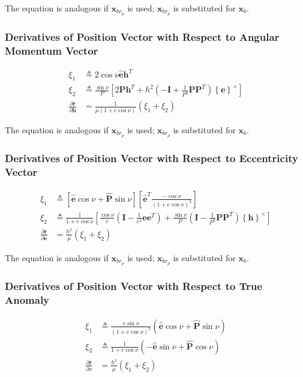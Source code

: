 \documentclass[]{article}
\newcommand{\vb}[1]{\bm{#1}} %
\newcommand{\vbh}[1]{\hat{\bm{#1}}} %
\newcommand{\pd}[2]{\frac{\partial #1}{\partial #2}} %
\newcommand{\crossmat}[1]{\left\{ {#1} \right\}^{\times}} %
\newcommand{\xb}[0]{\vb{x}_b}
\newcommand{\xbrp}[0]{\vb{x}_{br_p}}
\begin{document}
The equation is analogous if $\xbrp$ is used; $\xbrp$ is substituted for $\xb$.

\subsubsection{Derivatives of Position Vector with Respect to Angular Momentum Vector}

\begin{align}
	\xi_1 &\triangleq 2 \cos{\nu} \vbh{e} \vb{h}^T \\
	\xi_2 &\triangleq \frac{\sin{\nu}}{P} \left[ 2 \vb{P} \vb{h}^T + h^2 \left( -\vb{I} + \frac{1}{P^2} \vb{P} \vb{P}^T \right) \left\{ \vb{e} \right\}^{\times} \right] \\
	\pd{\vb{r}}{\vb{h}} &= \frac{1}{\mu \left(1 + e \cos \nu \right)} \left( \xi_1 + \xi_2 \right)
\end{align}

The equation is analogous if $\xbrp$ is used; $\xbrp$ is substituted for $\xb$.

\subsubsection{Derivatives of Position Vector with Respect to Eccentricity Vector}

\begin{align}
	\xi_1 &\triangleq  \left[ \vbh{e} \cos{\nu} + \vbh{P} \sin{\nu} \right] \left[\vbh{e}^T \frac{-\cos{\nu}}{\left( 1 + e \cos{\nu} \right)^2} \right] \\
	\xi_2 &\triangleq \frac{1}{1 + e \cos{\nu}} \left[ \frac{\cos{\nu}}{e} \left( \vb{I} - \frac{1}{e^2} \vb{e} \vb{e}^T \right) + \frac{\sin{\nu}}{P} \left( \vb{I} - \frac{1}{P^2} \vb{P} \vb{P}^T \right) \crossmat{\vb{h}} \right] \\
	\pd{\vb{r}}{\vb{e}} &= \frac{h^2}{\mu} \left( \xi_1 + \xi_2 \right)
\end{align}

The equation is analogous if $\xbrp$ is used; $\xbrp$ is substituted for $\xb$.

\subsubsection{Derivatives of Position Vector with Respect to True Anomaly}

\begin{align}
	\xi_1 &\triangleq \frac{e \sin{\nu}}{\left(1 + e \cos{\nu} \right)^2} \left( \vbh{e} \cos{\nu} + \vbh{P} \sin{\nu} \right) \\
	\xi_2 &\triangleq \frac{1}{1 + e \cos{\nu}} \left( -\vbh{e} \sin{\nu} + \vbh{P} \cos{\nu} \right) \\
	\pd{\vb{r}}{\nu} &= \frac{h^2}{\mu} \left( \xi_1 + \xi_2 \right)
\end{align}
\end{document}
